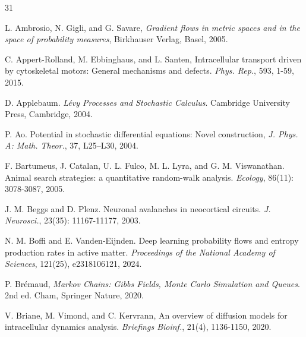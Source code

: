 \documentclass[10pt]{article}
\theoremstyle{definition}
\numberwithin{equation}{section}
\begin{document}
\begin{thebibliography}{31}



L. Ambrosio, N. Gigli, and G. Savare, {\it Gradient flows in metric spaces and in the space of probability measures}, Birkhauser Verlag, Basel, 2005.

C. Appert-Rolland, M. Ebbinghaus, and L. Santen,
Intracellular transport driven by cytoskeletal motors: General mechanisms and defects.
\textit{Phys. Rep.}, 593, 1-59, 2015.

 D. Applebaum. {\it L\'{e}vy Processes and Stochastic Calculus}. Cambridge University Press, Cambridge, 2004.

 P. Ao. Potential in stochastic differential equations: Novel construction, {\it J. Phys. A: Math. Theor.}, 37, L25--L30, 2004.



 F. Bartumeus, J. Catalan, U. L. Fulco, M. L. Lyra, and G. M. Viswanathan. Animal search strategies: a quantitative random-walk analysis. {\it Ecology}, 86(11): 3078-3087, 2005.

 J. M. Beggs and D. Plenz. Neuronal avalanches in neocortical circuits. {\it J. Neurosci.}, 23(35): 11167-11177, 2003.

 N. M. Boffi and E. Vanden-Eijnden. Deep learning probability flows and entropy production rates in active matter. {\it Proceedings of the National Academy of Sciences}, 121(25), e2318106121, 2024.

P. Br\'emaud,
\textit{Markov Chains: Gibbs Fields, Monte Carlo Simulation and Queues}.
2nd ed. Cham, Springer Nature, 2020.

V. Briane, M. Vimond, and C. Kervrann,
An overview of diffusion models for intracellular dynamics analysis.
\textit{Briefings Bioinf.}, 21(4), 1136-1150, 2020.


\end{thebibliography}
\end{document}
